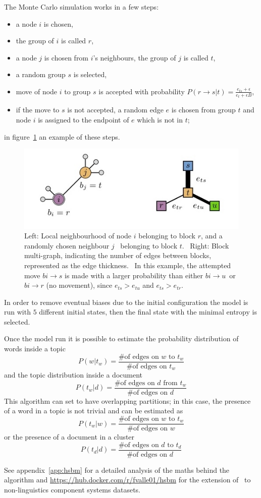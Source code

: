 The Monte Carlo simulation works in a few steps:
\begin{itemize}
 \item a node $i$ is chosen,
 \item the group of $i$ is called $r$,
  \item a node $j$ is chosen from $i$'s neighbours, the group of $j$ is called $t$,
  \item a random group $s$ is selected,
  \item move of node $i$ to group $s$ is accepted with probability $P(r\to s|t)=\frac{e_{ts}+\epsilon}{e_t+\epsilon B}$,
  \item if the move to $s$ is not accepted, a random edge $e$ is chosen from group $t$ and node $i$ is assigned to the endpoint of $e$ which is not in $t$;
\end{itemize}
in figure~\ref{fig:topic_peixioto_move} an example of these steps.
\begin{figure}[htb!]
  \centering
  \includegraphics[width=0.9\linewidth]{pictures/topic/peixioto_move.jpg}
  \caption{Left: Local neighbourhood of node $i$ belonging to block $r$, and a randomly chosen neighbour $j$ \
  belonging to block $t$. \
  Right: Block multi-graph, indicating the number of edges between blocks, represented as the edge thickness. \
  In this example, the attempted move $bi \to s$ is made with a larger probability than either $bi \to u$\
   or $bi \to r$ (no movement), since $e_{ts}>e_{tu}$ and $e_{ts}>e_{tr}$.}
  \label{fig:topic_peixioto_move}
\end{figure}

In order to remove eventual biases due to the initial configuration the model is run with $5$ different initial states, then the final state with the minimal entropy is selected.

Once the model run it is possible to estimate the probability distribution of words inside a topic
\[P(w|t_w)=\frac{\text{\# of edges on $w$ to $t_w$}}{\text{\# of edges on $t_w$}}\]
and the topic distribution inside a document
\[P(t_w|d)=\frac{\text{\# of edges on $d$ from $t_w$}}{\text{\# of edges on $d$}}\]
This algorithm can set to have overlapping partitions; in this case, the presence of a word in a topic is not trivial and can be estimated as
\[P(t_w|w)=\frac{\text{\# of edges on $w$ to $t_w$}}{\text{\# of edges on $w$}}\]
or the presence of a document in a cluster
\[P(t_d|d)=\frac{\text{\# of edges on $d$ to $t_d$}}{\text{\# of edges on $d$}}\]

See appendix~\ref{app:hsbm} for a detailed analysis of the maths behind the algorithm and \url{https://hub.docker.com/r/fvalle01/hsbm} for the extension of~\cite{gerlach2018network} to non-linguistics component systems datasets.
